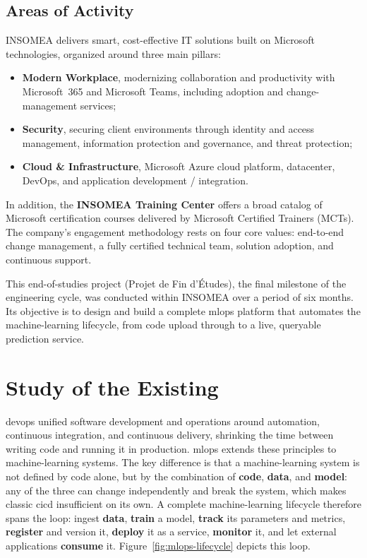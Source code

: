 \subsection{Areas of Activity}
INSOMEA delivers smart, cost-effective IT solutions built on Microsoft
technologies, organized around three main pillars:
\begin{itemize}[leftmargin=1.4em]
  \item \textbf{Modern Workplace}, modernizing collaboration and productivity
        with Microsoft~365 and Microsoft Teams, including adoption and
        change-management services;
  \item \textbf{Security}, securing client environments through identity and
        access management, information protection and governance, and threat
        protection;
  \item \textbf{Cloud \& Infrastructure}, Microsoft Azure cloud platform,
        datacenter, DevOps, and application development / integration.
\end{itemize}
In addition, the \textbf{INSOMEA Training Center} offers a broad catalog of
Microsoft certification courses delivered by Microsoft Certified Trainers (MCTs).
The company's engagement methodology rests on four core values: end-to-end change
management, a fully certified technical team, solution adoption, and continuous
support.

This end-of-studies project (Projet de Fin d'\'Etudes), the final milestone of the
engineering cycle, was conducted within INSOMEA over a period of six months. Its
objective is to design and build a complete \gls{mlops} platform that automates the
machine-learning lifecycle, from code upload through to a live, queryable
prediction service.

\section{Study of the Existing}
\label{sec:existing}
\gls{devops} unified software development and operations around automation,
continuous integration, and continuous delivery, shrinking the time between
writing code and running it in production. \gls{mlops} extends these principles to
machine-learning systems. The key difference is that a machine-learning system is
not defined by code alone, but by the combination of \textbf{code}, \textbf{data},
and \textbf{model}: any of the three can change independently and break the system,
which makes classic \gls{cicd} insufficient on its own. A complete machine-learning
lifecycle therefore spans the loop: ingest \textbf{data}, \textbf{train} a model,
\textbf{track} its parameters and metrics, \textbf{register} and version it,
\textbf{deploy} it as a service, \textbf{monitor} it, and let external applications
\textbf{consume} it. Figure~\ref{fig:mlops-lifecycle} depicts this loop.

